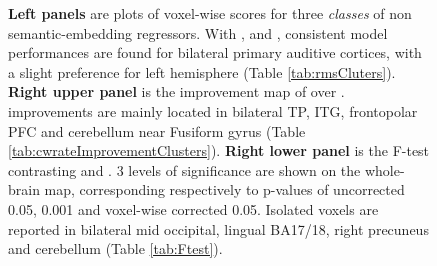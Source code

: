 \begin{figure}
    \centering
    \caption[Encoding with  Features, Group]{\textbf{Left panels} are plots of voxel-wise  scores for three \emph{classes} of non semantic-embedding regressors. With ,  and , consistent model performances are found for bilateral primary auditive cortices, with a slight preference for left hemisphere (Table \ref{tab:rmsCluters}). \textbf{Right upper panel} is the  improvement map of  over .  improvements are mainly located in bilateral TP, ITG, frontopolar PFC and cerebellum near Fusiform gyrus (Table \ref{tab:cwrateImprovementClusters}). \textbf{Right lower panel} is the F-test contrasting  and . 3 levels of significance  are shown on the whole-brain map, corresponding respectively to p-values of uncorrected 0.05, 0.001 and voxel-wise corrected 0.05. Isolated voxels are reported in bilateral mid occipital, lingual BA17/18, right precuneus and cerebellum (Table \ref{tab:Ftest}).} 
    \label{fig:BASE_ContrastMapG}
\end{figure}

